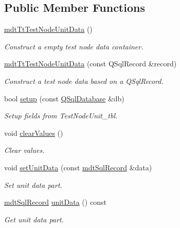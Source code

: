 \subsection*{Public Member Functions}
\begin{DoxyCompactItemize}
\item 
\hyperlink{classmdt_tt_test_node_unit_data_ab50920d5dc8058e41f79f5f0a72e1e3d}{mdt\-Tt\-Test\-Node\-Unit\-Data} ()
\begin{DoxyCompactList}\small\item\em Construct a empty test node data container. \end{DoxyCompactList}\item 
\hyperlink{classmdt_tt_test_node_unit_data_a149a8299df5a78daa85f49c680a41e21}{mdt\-Tt\-Test\-Node\-Unit\-Data} (const Q\-Sql\-Record \&record)
\begin{DoxyCompactList}\small\item\em Construct a test node data based on a Q\-Sql\-Record. \end{DoxyCompactList}\item 
bool \hyperlink{classmdt_tt_test_node_unit_data_a09666f9fa0c3ea510eef5cda432f1166}{setup} (const \hyperlink{class_q_sql_database}{Q\-Sql\-Database} \&db)
\begin{DoxyCompactList}\small\item\em Setup fields from Test\-Node\-Unit\-\_\-tbl. \end{DoxyCompactList}\item 
void \hyperlink{classmdt_tt_test_node_unit_data_a774da621d18566dcf42329664a356cad}{clear\-Values} ()
\begin{DoxyCompactList}\small\item\em Clear values. \end{DoxyCompactList}\item 
void \hyperlink{classmdt_tt_test_node_unit_data_a51e6a518bda41df4f4a68fee0fbff472}{set\-Unit\-Data} (const \hyperlink{classmdt_sql_record}{mdt\-Sql\-Record} \&data)
\begin{DoxyCompactList}\small\item\em Set unit data part. \end{DoxyCompactList}\item 
\hyperlink{classmdt_sql_record}{mdt\-Sql\-Record} \hyperlink{classmdt_tt_test_node_unit_data_afc769bf48aa7068a08b57330a509b566}{unit\-Data} () const 
\begin{DoxyCompactList}\small\item\em Get unit data part. \end{DoxyCompactList}\end{DoxyCompactItemize}
